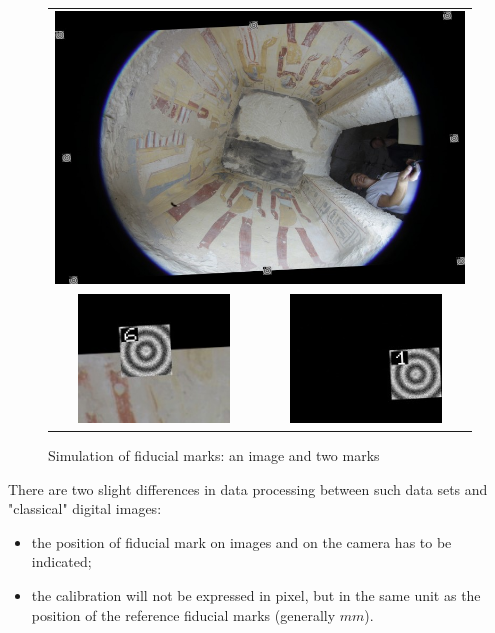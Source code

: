 \begin{figure}
\begin{tabular}{||c|c||}
   \hline \hline
   \multicolumn{2}{c|}{\includegraphics[width=120mm]{FIGS/Niche/ImGlob.jpg}} \\
   \includegraphics[width=40mm]{FIGS/Niche/Cible1.jpg} &
   \includegraphics[width=40mm]{FIGS/Niche/Cible2.jpg}
\end{tabular}
\caption{Simulation of fiducial marks: an image and two marks }
\label{ImFid}
\end{figure}


There are two slight differences in data processing between such data sets and "classical" digital images:


\begin{itemize}
   \item the position of fiducial mark on images and on the camera has to be indicated;
   \item the calibration will not be expressed in pixel, but in the same unit
         as the position of the reference fiducial marks (generally $mm$).
\end{itemize}

